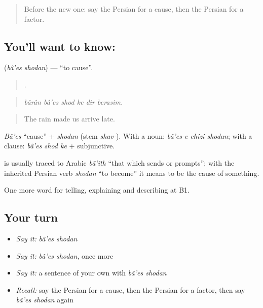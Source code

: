 \label{lesson:FA-C369-baes-shodan}



\begin{quote}
Before the new one: say the Persian for a cause, then the Persian for a factor.
\end{quote}

\subsection*{You'll want to know:  }
\textbf{ } (\emph{bâ'es shodan}) — \textquotedblleft{}to cause\textquotedblright{}.

\begin{quote}
     .
\end{quote}

\begin{quote}
\emph{bârân bâ'es shod ke dir berasim.}
\end{quote}

\begin{quote}
The rain made us arrive late.
\end{quote}

\emph{Bâ'es} \textquotedblleft{}cause\textquotedblright{} + \emph{shodan} (stem \emph{shav-}). With a noun: \emph{bâ'es-e chizi shodan}; with a clause: \emph{bâ'es shod ke} + subjunctive.

\begin{cousinweb}
\textbf{} is usually traced to Arabic \emph{bā'ith} \textquotedblleft{}that which sends or prompts\textquotedblright{}; with the inherited Persian verb \emph{shodan} \textquotedblleft{}to become\textquotedblright{} it means to be the cause of something.
\end{cousinweb}

\begin{grammarlens}[title={What you've built}]
One more word for telling, explaining and describing at B1.
\end{grammarlens}

\subsection*{Your turn}
\begin{itemize}
\raggedright
  \item \emph{Say it:} \emph{bâ'es shodan}
  \item \emph{Say it:} \emph{bâ'es shodan}, once more
  \item \emph{Say it:} a sentence of your own with \emph{bâ'es shodan}
  \item \emph{Recall:} say the Persian for a cause, then the Persian for a factor, then say \emph{bâ'es shodan} again
\end{itemize}

